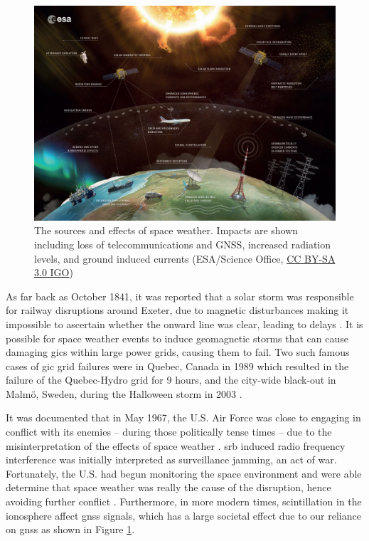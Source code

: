 \begin{figure}[ht!]
	\centering
	\includegraphics[width=\columnwidth]{Space_weather_effects_rescaled.jpg}
	\caption{The sources and effects of space weather. Impacts are shown including loss of telecommunications and GNSS, increased radiation levels, and ground induced currents (ESA/Science Office, \href{http://www.esa.int/spaceinimages/ESA_Multimedia/Copyright_Notice_Images}{CC BY-SA 3.0 IGO})}
	\label{fig:space_weather_impacts}
\end{figure}

\vspace{1em}

As far back as October 1841, it was reported that a solar storm was responsible for railway disruptions around Exeter, due to magnetic disturbances making it impossible to ascertain whether the onward line was clear, leading to delays \citep{nature_observations_1871}. It is possible for space weather events to induce geomagnetic storms that can cause damaging \glspl{gic} within large power grids, causing them to fail. Two such famous cases of \gls{gic} grid failures were in Quebec, Canada in 1989 which resulted in the failure of the Quebec-Hydro grid for 9 hours, and the city-wide black-out in Malm{\"o}, Sweden, during the Halloween storm in 2003 \citep{viljanen_european_2011, beggan_ground_2018}.

It was documented that in May 1967, the U.S. Air Force was close to engaging in conflict with its enemies -- during those politically tense times -- due to the misinterpretation of the effects of space weather \citep{knipp_may_2016}. \gls{srb} induced radio frequency interference was initially interpreted as surveillance jamming, an act of war. Fortunately, the U.S. had begun monitoring the space environment and were able determine that space weather was really the cause of the disruption, hence avoiding further conflict \citep{knipp_may_2016}. Furthermore, in more modern times, scintillation in the ionosphere affect \gls{gnss} signals, which has a large societal effect due to our reliance on \gls{gnss} \citep{cannon_extreme_2013} as shown in Figure \ref{fig:space_weather_impacts}.

